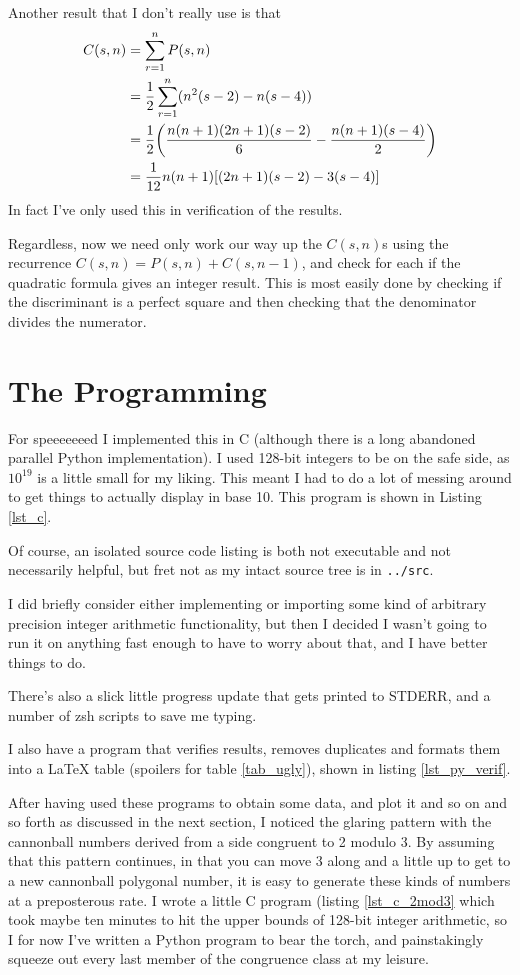 Another result that I don't really use is that
\begin{align*}
C(s, n) &= \sum_{r = 1}^n P(s, n) \\
    &= \frac 12 \sum_{r = 1}^n (n^2(s - 2) - n(s - 4)) \\
    &= \frac 12 \pqty{\frac{n(n + 1)(2n + 1)(s - 2)} 6
                    - \frac{n(n + 1)(s - 4)} 2} \\
    &= \frac 1{12}n(n + 1)\bqty{(2n + 1)(s - 2) - 3(s - 4)}
\end{align*}
In fact I've only used this in verification of the results.

Regardless, now we need only work our way up the \(C(s, n)\)s using the
recurrence \(C(s, n) = P(s, n) + C(s, n - 1)\), and check for each if the
quadratic formula gives an integer result. This is most easily done by checking
if the discriminant is a perfect square and then checking that the denominator
divides the numerator.

\section{The Programming}

For speeeeeeed I implemented this in C (although there is a long abandoned
parallel Python implementation). I used 128-bit integers to be on the safe side,
as \(10^{19}\) is a little small for my liking. This meant I had to do a lot of
messing around to get things to actually display in base 10. This program is
shown in Listing \ref{lst_c}.

Of course, an isolated source code listing is both not executable and not
necessarily helpful, but fret not as my intact source tree is in
\texttt{../src}.

I did briefly consider either implementing or importing some kind of arbitrary
precision integer arithmetic functionality, but then I decided I wasn't going to
run it on anything fast enough to have to worry about that, and I have better
things to do.

There's also a slick little progress update that gets printed to STDERR, and a
number of zsh scripts to save me typing.

I also have a program that verifies results, removes duplicates and formats them
into a \LaTeX{} table (spoilers for table \ref{tab_ugly}), shown in listing
\ref{lst_py_verif}.

After having used these programs to obtain some data, and plot it and so on and
so forth as discussed in the next section, I noticed the glaring pattern with
the cannonball numbers derived from a side congruent to 2 modulo 3. By
assuming that this pattern continues, in that you can move 3 along and a little
up to get to a new cannonball polygonal number, it is easy to generate these
kinds of numbers at a preposterous rate. I wrote a little C program (listing
\ref{lst_c_2mod3} which took maybe ten minutes to hit the upper bounds of
128-bit integer arithmetic, so I for now I've written a Python program to bear
the torch, and painstakingly squeeze out every last member of the congruence
class at my leisure.

